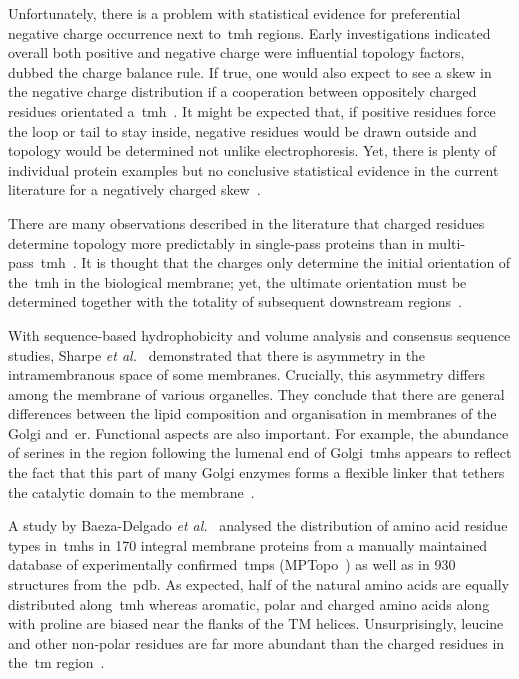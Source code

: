 Unfortunately, there is a problem with statistical evidence for preferential negative charge occurrence next to~\gls{tmh} regions.
Early investigations indicated overall both positive and negative charge were influential topology factors, dubbed the charge balance rule.
If true, one would also expect to see a skew in the negative charge distribution if a cooperation between oppositely charged residues orientated a~\gls{tmh}~\cite{Sipos1993, Hartmann1989}.
It might be expected that, if positive residues force the loop or tail to stay inside, negative residues would be drawn outside and topology would be determined not unlike electrophoresis.
Yet, there is plenty of individual protein examples but no conclusive statistical evidence in the current literature for a negatively charged skew~\cite{Sharpe2010, Baeza-Delgado2013, Granseth2005, Pogozheva2013, Nilsson2005a, Andersson1992}.

There are many observations described in the literature that charged residues determine topology more predictably in single-pass proteins than in multi-pass~\gls{tmh}~\cite{Kim1994, Harley1998}.
It is thought that the charges only determine the initial orientation of the~\gls{tmh} in the biological membrane; yet, the ultimate orientation must be determined together with the totality of subsequent downstream regions~\cite{Sato1998}.

With sequence-based hydrophobicity and volume analysis and consensus sequence studies, Sharpe \textit{et al.}~\cite{Sharpe2010} demonstrated that there is asymmetry in the intramembranous space of some membranes.
Crucially, this asymmetry differs among the membrane of various organelles.
They conclude that there are general differences between the lipid composition and organisation in membranes of the Golgi and~\gls{er}.
Functional aspects are also important.
For example, the abundance of serines in the region following the lumenal end of Golgi~\gls{tmh}s appears to reflect the fact that this part of many Golgi enzymes forms a flexible linker that tethers the catalytic domain to the membrane~\cite{Sharpe2010}.

A study by Baeza-Delgado \textit{et al.}~\cite{Baeza-Delgado2013} analysed the distribution of amino acid residue types in~\gls{tmh}s in 170 integral membrane proteins from a manually maintained database of experimentally confirmed~\gls{tmp}s (MPTopo~\cite{Jayasinghe2001}) as well as in 930 structures from the~\gls{pdb}.
As expected, half of the natural amino acids are equally distributed along~\gls{tmh} whereas aromatic, polar and charged amino acids along with proline are biased near the flanks of the TM helices.
Unsurprisingly, leucine and other non-polar residues are far more abundant than the charged residues in the~\gls{tm} region~\cite{Sharpe2010}.

